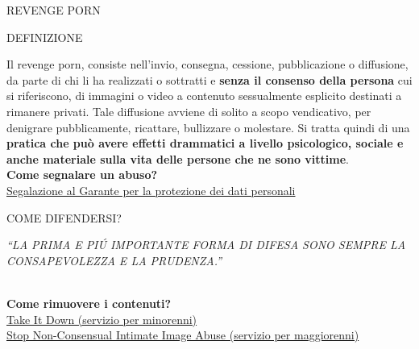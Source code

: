 \documentclass[aspectratio=1610]{beamer}
\begin{document}
\begin{frame}{REVENGE PORN}
    \begin{alertblock}{DEFINIZIONE}
        \begin{minipage}{0.98\linewidth}
            \justifying
            Il revenge porn, consiste nell’invio, consegna, cessione, pubblicazione o diffusione, 
            da parte di chi li ha realizzati o sottratti e \textbf{senza il consenso della persona} cui si riferiscono, 
            di immagini o video a contenuto sessualmente esplicito destinati a rimanere privati. 
            Tale diffusione avviene di solito a scopo vendicativo, per denigrare pubblicamente, 
            ricattare, bullizzare o molestare. Si tratta quindi di una \textbf{pratica che può avere effetti 
            drammatici a livello psicologico, sociale e anche materiale sulla vita delle persone che ne sono vittime}.\\
            \bigskip
            \tiny{\textbf{Come segnalare un abuso?}}\\
            \tiny{\href{https://servizi.gpdp.it/diritti/s/revenge-porn-scelta-auth}{Segalazione al Garante per la protezione dei dati personali}}\\
        \end{minipage}
    \end{alertblock}
\end{frame}

\begin{frame}{COME DIFENDERSI?}
    \begin{minipage}{0.98\linewidth}
        \centering
        \huge
        \textit{``LA PRIMA E PI\'U IMPORTANTE FORMA DI DIFESA SONO SEMPRE LA CONSAPEVOLEZZA E LA PRUDENZA.''}\\
    \end{minipage}\\
    \bigskip
    \tiny{\textbf{Come rimuovere i contenuti?}}\\
    \tiny{\href{https://takeitdown.ncmec.org/it/}{Take It Down (servizio per minorenni)}}\\
    \tiny{\href{https://stopncii.org/}{Stop Non-Consensual Intimate Image Abuse (servizio per maggiorenni)}}
\end{frame}
\end{document}
